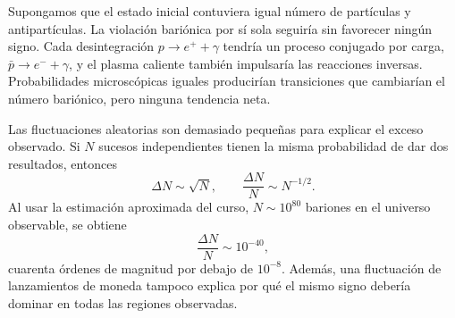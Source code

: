Supongamos que el estado inicial contuviera igual número de partículas y antipartículas. La violación bariónica por sí sola seguiría sin favorecer ningún signo. Cada desintegración \(p\to e^++\gamma\) tendría un proceso conjugado por carga, \(\bar p\to e^-+\gamma\), y el plasma caliente también impulsaría las reacciones inversas. Probabilidades microscópicas iguales producirían transiciones que cambiarían el número bariónico, pero ninguna tendencia neta.

\begin{classroomqa}
\end{classroomqa}

Las fluctuaciones aleatorias son demasiado pequeñas para explicar el exceso observado. Si \(N\) sucesos independientes tienen la misma probabilidad de dar dos resultados, entonces
\begin{equation}
\Delta N\sim\sqrt N,
\qquad
\frac{\Delta N}{N}\sim N^{-1/2}.
\end{equation}
Al usar la estimación aproximada del curso, \(N\sim10^{80}\) bariones en el universo observable, se obtiene
\begin{equation}
\frac{\Delta N}{N}\sim10^{-40},
\end{equation}
cuarenta órdenes de magnitud por debajo de \(10^{-8}\). Además, una fluctuación de lanzamientos de moneda tampoco explica por qué el mismo signo debería dominar en todas las regiones observadas.

\begin{classroomqa}
\end{classroomqa}

